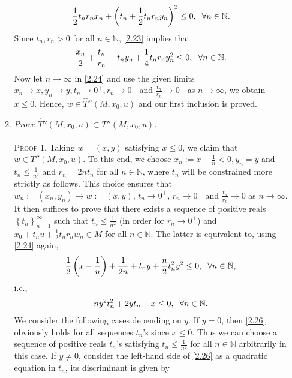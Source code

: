 \documentclass[a4paper]{article}
\numberwithin{equation}{section}
\begin{document}
\begin{enumerate}
\begin{enumerate}
\begin{align}
\label{2.23}
\frac{1}{2}{t_n}{r_n}{x_n} + {\left( {{t_n} + \frac{1}{2}{t_n}{r_n}{y_n}} \right)^2} \le 0,\hspace{0.2cm}\forall n \in \mathbb{N}.
\end{align}
Since $t_n,r_n>0$ for all $n\in \mathbb{N}$, \eqref{2.23} implies that
\begin{align}
\label{2.24}
\frac{{{x_n}}}{2} + \frac{{{t_n}}}{{{r_n}}} + {t_n}{y_n} + \frac{1}{4}{t_n}{r_n}y_n^2 \le 0,\hspace{0.2cm}\forall n \in \mathbb{N}.
\end{align}
Now let $n\to \infty$ in \eqref{2.24} and use the given limits $x_n\to x, y_n\to y, t_n\to 0^+,r_n\to 0^+$ and $\frac{t_n}{r_n}\to 0^+$ as $n\to \infty$, we obtain $x\le 0$. Hence, $w\in \widehat{T}''\left(M,x_0,u\right)$ and our first inclusion is proved.
\item \textit{Prove $\widehat T''\left( {M,{x_0},u} \right) \subset T''\left( {M,{x_0},u} \right)$.}\\
\\
\textsc{Proof 1.} Taking $w=\left(x,y\right)$ satisfying $x\le 0$, we claim that $w\in T''\left(M,x_0,u\right)$. To this end, we choose $x_n:=x-\frac{1}{n} <0, y_n=y$ and $t_n\le \frac{1}{n^2}$ and $r_n=2nt_n$ for all $n\in \mathbb{N}$, where $t_n$ will be constrained more strictly as follows. This choice ensures that $w_n:=\left(x_n,y_n\right)\to w:=\left(x,y\right)$, $t_n\to 0^+$, $r_n\to 0^+$ and $\frac{t_n}{r_n}\to 0$ as $n\to \infty$. It then suffices to prove that there exists a sequence of positive reals $\left\{ {{t_n}} \right\}_{n = 1}^\infty $ such that $t_n\le \frac{1}{n^2}$ (in order for $r_n\to 0^+$) and ${x_0} + {t_n}u + \frac{1}{2}{t_n}{r_n}{w_n} \in M$ for all $n\in \mathbb{N}$. The latter is equivalent to, using \eqref{2.24} again, 
\begin{align}
\frac{1}{2}\left( {x - \frac{1}{n}} \right) + \frac{1}{{2n}} + {t_n}y + \frac{n}{2}t_n^2{y^2} \le 0,\hspace{0.2cm}\forall n \in \mathbb{N},
\end{align}
i.e.,
\begin{align}
\label{2.26}
n{y^2}t_n^2 + 2y{t_n} + x \le 0,\hspace{0.2cm} \forall n \in \mathbb{N}.
\end{align}
We consider the following cases depending on $y$. If $y=0$, then \eqref{2.26} obviously holds for all sequences $t_n$'s since $x\le 0$. Thus we can choose a sequence of positive reals $t_n$'s satisfying $t_n\le \frac{1}{n^2}$ for all $n\in \mathbb{N}$ arbitrarily in this case. If $y\ne 0$, consider the left-hand side of \eqref{2.26} as a quadratic equation in $t_n$, its discriminant is given by

\end{enumerate}
\end{enumerate}
\end{document}
